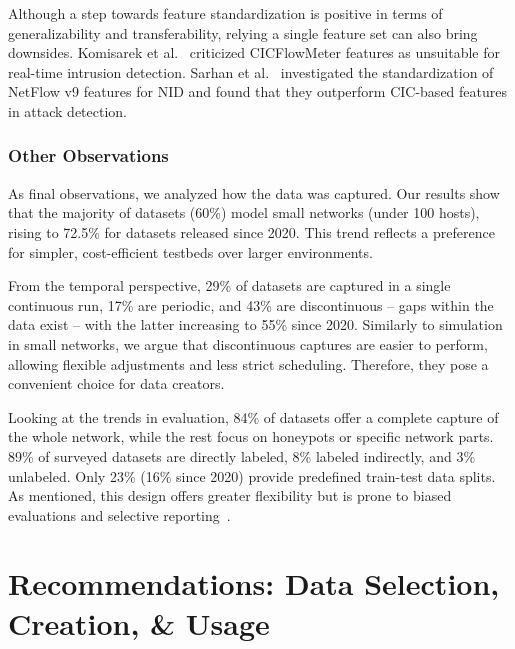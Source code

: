 Although a step towards feature standardization is positive in terms of generalizability and transferability, relying a single feature set can also bring downsides. Komisarek et al.~\cite{komisarek2022_simargl2022} criticized CICFlowMeter features as unsuitable for real-time intrusion detection. Sarhan et al.~\cite{sarhan2022_nids_feature_set} investigated the standardization of NetFlow v9 features for NID and found that they outperform CIC-based features in attack detection.

\subsubsection{Other Observations}
\label{sssec:ndatasurv_trends_others}

As final observations, we analyzed how the data was captured. Our results show that the majority of datasets (60\%) model small networks (under 100 hosts), rising to 72.5\% for datasets released since 2020. This trend reflects a preference for simpler, cost-efficient testbeds over larger environments.

From the temporal perspective, 29\% of datasets are captured in a single continuous run, 17\% are periodic, and 43\% are discontinuous -- gaps within the data exist -- with the latter increasing to 55\% since 2020. Similarly to simulation in small networks, we argue that discontinuous captures are easier to perform, allowing flexible adjustments and less strict scheduling. Therefore, they pose a convenient choice for data creators.

Looking at the trends in evaluation, 84\% of datasets offer a complete capture of the whole network, while the rest focus on honeypots or specific network parts. 89\% of surveyed datasets are directly labeled, 8\% labeled indirectly, and 3\% unlabeled. Only 23\% (16\% since 2020) provide predefined train-test data splits. As mentioned, this design offers greater flexibility but is prone to biased evaluations and selective reporting~\cite{arp2022_dos_donts_ml_security,lipton2019_research_for_practice_troubling_trends}.


\section{Recommendations: Data Selection, Creation, \& Usage}
\label{sec:recommendations}

